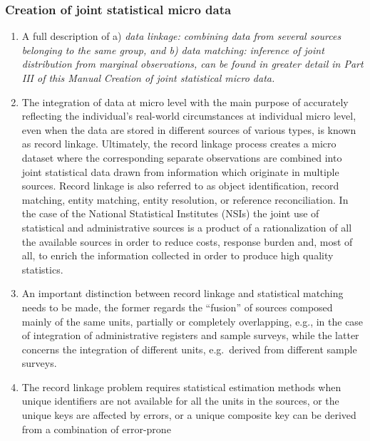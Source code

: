 \documentclass[
]{article}
\begin{document}
\hypertarget{d.2.-creation-of-joint-statistical-micro-data}{%
\subsubsection{Creation of joint statistical micro data}\label{d.2.-creation-of-joint-statistical-micro-data}}

\begin{enumerate}
\def\labelenumi{\arabic{enumi}.}
\setcounter{enumi}{221}
\item
  A full description of a) \emph{data linkage: combining data from several
  sources belonging to the same group, and b) data matching: inference
  of joint distribution from marginal observations, can be found in
  greater detail in Part III of this Manual} \emph{Creation of joint
  statistical micro data. }
\item
  The integration of data at micro level with the main purpose of
  accurately reflecting the individual's real-world circumstances at
  individual micro level, even when the data are stored in different
  sources of various types, is known as record linkage. Ultimately,
  the record linkage process creates a micro dataset where the
  corresponding separate observations are combined into joint
  statistical data drawn from information which originate in multiple
  sources. Record linkage is also referred to as object
  identification, record matching, entity matching, entity resolution,
  or reference reconciliation. In the case of the National Statistical
  Institutes (NSIs) the joint use of statistical and administrative
  sources is a product of a rationalization of all the available
  sources in order to reduce costs, response burden and, most of all,
  to enrich the information collected in order to produce high quality
  statistics.
\item
  An important distinction between record linkage and statistical
  matching needs to be made, the former regards the ``fusion'' of
  sources composed mainly of the same units, partially or completely
  overlapping, e.g., in the case of integration of administrative
  registers and sample surveys, while the latter concerns the
  integration of different units, e.g.~derived from different sample
  surveys.
\item
  The record linkage problem requires statistical estimation methods
  when unique identifiers are not available for all the units in the
  sources, or the unique keys are affected by errors, or a unique
  composite key can be derived from a combination of error-prone

\end{enumerate}
\end{document}
